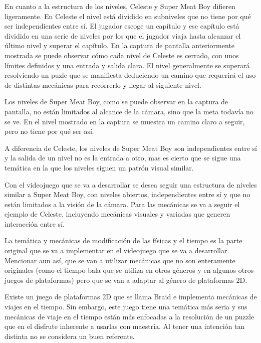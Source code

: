 En cuanto a la estructura de los niveles, Celeste y Super Meat Boy difieren ligeramente. En Celeste el nivel está dividido en subniveles que no tiene por qué ser independientes entre sí. El jugador escoge un capítulo y ese capítulo está dividido en una serie de niveles por los que el jugador viaja hasta alcanzar el último nivel y superar el capítulo. En la captura de pantalla anteriormente mostrada se puede observar cómo cada nivel de Celeste es cerrado, con unos límites definidos y una entrada y salida clara. El nivel generalmente se superará resolviendo un puzle que se manifiesta deduciendo un camino que requerirá el uso de distintas mecánicas para recorrerlo y llegar al siguiente nivel.

Los niveles de Super Meat Boy, como se puede observar en la captura de pantalla, no están limitados al alcance de la cámara, sino que la meta todavía no se ve. En el nivel mostrado en la captura se muestra un camino claro a seguir, pero no tiene por qué ser así.

A diferencia de Celeste, los niveles de Super Meat Boy son independientes entre sí y la salida de un nivel no es la entrada a otro, mas es cierto que se sigue una temática en la que los niveles siguen un patrón visual similar. 

Con el videojuego que se va a desarrollar se desea seguir una estructura de niveles similar a Super Meat Boy, con niveles abiertos, independientes entre sí y que no están limitados a la visión de la cámara.
Para las mecánicas se va a seguir el ejemplo de Celeste, incluyendo mecánicas visuales y variadas que generen interacción entre sí.

La temática y mecánicas de modificación de las físicas y el tiempo es la parte original que se va a implementar en el videojuego que se va a desarrollar. Mencionar aun así, que se van a utilizar mecánicas que no son enteramente originales (como el tiempo bala que se utiliza en otros géneros y en algunos otros juegos de plataformas) pero que se van a adaptar al género de plataformas 2D.

Existe un juego de plataformas 2D que se llama Braid \footnotemark e implementa mecánicas de viajes en el tiempo. Sin embargo, este juego tiene una temática más seria y sus mecánicas de viaje en el tiempo están más enfocadas a la resolución de un puzzle que en el disfrute inherente a usarlas con maestría. Al tener una intención tan distinta no se considera un buen referente.


